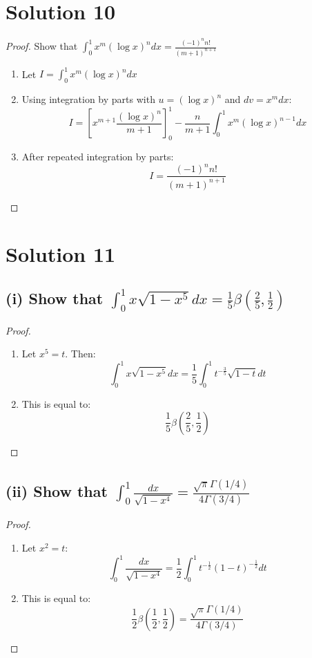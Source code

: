 \documentclass{article}
\begin{document}
\section*{Solution 10}
\begin{proof}
Show that $\int_0^1 x^m(\log x)^n dx = \frac{(-1)^n n!}{(m+1)^{n+1}}$

\begin{enumerate}
\item Let $I = \int_0^1 x^m(\log x)^n dx$

\item Using integration by parts with $u = (\log x)^n$ and $dv = x^m dx$:
\[ I = \left[x^{m+1}\frac{(\log x)^n}{m+1}\right]_0^1 - \frac{n}{m+1}\int_0^1 x^m(\log x)^{n-1}dx \]

\item After repeated integration by parts:
\[ I = \frac{(-1)^n n!}{(m+1)^{n+1}} \]
\end{enumerate}
\end{proof}

\section*{Solution 11}

\subsection*{(i) Show that $\int_0^1 x\sqrt{1-x^5}dx = \frac{1}{5}\beta(\frac{2}{5}, \frac{1}{2})$}

\begin{proof}
\begin{enumerate}
\item Let $x^5 = t$. Then:
\[ \int_0^1 x\sqrt{1-x^5}dx = \frac{1}{5}\int_0^1 t^{-\frac{3}{5}}\sqrt{1-t}dt \]

\item This is equal to:
\[ \frac{1}{5}\beta(\frac{2}{5}, \frac{1}{2}) \]
\end{enumerate}
\end{proof}

\subsection*{(ii) Show that $\int_0^1 \frac{dx}{\sqrt{1-x^4}} = \frac{\sqrt{\pi}\Gamma(1/4)}{4\Gamma(3/4)}$}

\begin{proof}
\begin{enumerate}
\item Let $x^2 = t$:
\[ \int_0^1 \frac{dx}{\sqrt{1-x^4}} = \frac{1}{2}\int_0^1 t^{-\frac{1}{2}}(1-t)^{-\frac{1}{2}}dt \]

\item This is equal to:
\[ \frac{1}{2}\beta(\frac{1}{2}, \frac{1}{2}) = \frac{\sqrt{\pi}\Gamma(1/4)}{4\Gamma(3/4)} \]
\end{enumerate}
\end{proof}
\end{document}

